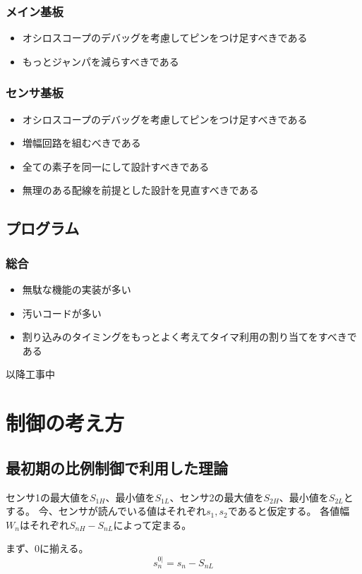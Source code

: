 \documentclass[a4paper]{ltjsarticle}
\begin{document}
\subsubsection{メイン基板}
\begin{itemize}
  \item オシロスコープのデバッグを考慮してピンをつけ足すべきである
  \item もっとジャンパを減らすべきである
\end{itemize}
\subsubsection{センサ基板}
\begin{itemize}
  \item オシロスコープのデバッグを考慮してピンをつけ足すべきである
  \item 増幅回路を組むべきである
  \item 全ての素子を同一にして設計すべきである
  \item 無理のある配線を前提とした設計を見直すべきである
\end{itemize}
\subsection{プログラム}
\subsubsection{総合}
\begin{itemize}
  \item 無駄な機能の実装が多い
  \item 汚いコードが多い
  \item 割り込みのタイミングをもっとよく考えてタイマ利用の割り当てをすべきである
\end{itemize}
以降工事中

\section{制御の考え方}
\subsection{最初期の比例制御で利用した理論}
センサ1の最大値を$S_{1H}$、最小値を$S_{1L}$、センサ2の最大値を$S_{2H}$、最小値を$S_{2L}$とする。
今、センサが読んでいる値はそれぞれ$s_{1},s_{2}$であると仮定する。
各値幅$W_{n}$はそれぞれ$S_{nH}-S_{nL}$によって定まる。

まず、0に揃える。
\begin{equation}
  s^{0|}_{n} = s_n-S_{nL}
\end{equation}
\end{document}
